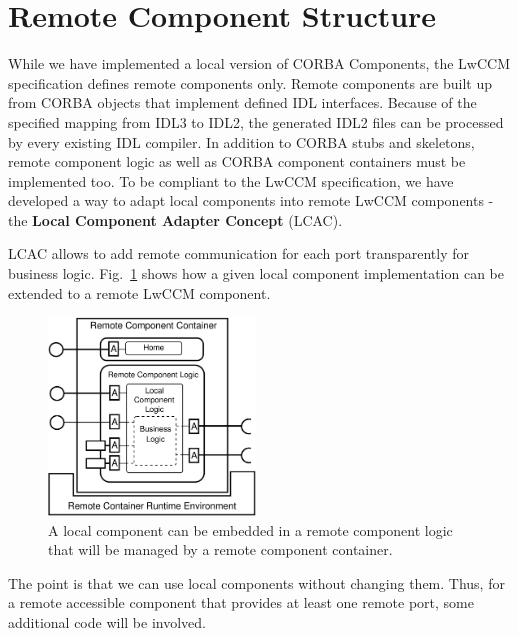 \section{Remote Component Structure}
\label{RemoteComponentStructure}

While we have implemented a local version of CORBA Components, 
the LwCCM specification defines remote components only.
Remote components are built up from CORBA objects that implement defined
IDL interfaces.
Because of the specified mapping from IDL3 to IDL2, the generated IDL2 files 
can be processed by every existing IDL compiler. In addition to CORBA stubs
and skeletons, remote component logic as well as CORBA component containers
must be implemented too. 
To be compliant to the LwCCM specification, we have developed a way to
adapt local components into remote LwCCM components - the 
{\bf Local Component Adapter Concept} (LCAC).

LCAC allows to add remote communication
for each port transparently for business logic.
Fig.~\ref{LcacOverview} shows how a given local component implementation
can be extended to a remote LwCCM component.

\begin{figure}[htbp]
    \begin{center}
    \includegraphics [width=5.5cm,angle=0] {ComponentModel/figures/LocalAdapterConcept}
    \caption{A local component can be embedded in a remote component logic
    that will be managed by a remote component container.}
    \label{LcacOverview}            
    \end{center}
\end{figure}

\noindent
The point is that we can use local components without changing them.
Thus, for a remote accessible component that provides at least one remote 
port, some additional code will be involved.

